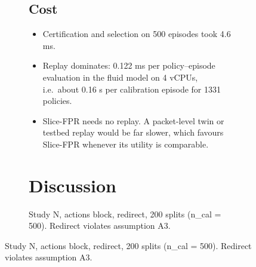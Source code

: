 \begin{figure}[!t]
{\begin{figure}[!t]
{\begin{table}[!t]
\centering
\caption{Study N, actions {block, redirect}, 200 splits (n\_cal = 500). Redirect violates assumption A3.}
\label{tab:confirm_N}
\footnotesize
{}
\end{table}

\hypertarget{cost}{%
\subsection{Cost}\label{cost}}

\begin{itemize}
\tightlist
\item
  Certification and selection on 500 episodes took 4.6 ms.
\item
  Replay dominates: 0.122 ms per policy--episode evaluation in the fluid
  model on 4 vCPUs, i.e.~about 0.16 s per calibration episode for 1331
  policies.
\item
  Slice-FPR needs no replay. A packet-level twin or testbed replay would
  be far slower, which favours Slice-FPR whenever its utility is
  comparable.
\end{itemize}

\hypertarget{sec:discussion}{%
\section{Discussion}\label{sec:discussion}}

}
\end{figure}}
\end{figure}
